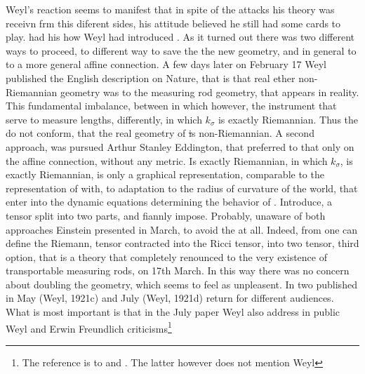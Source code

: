 \documentclass[draft]{article}
\begin{document}
{ Weyl's reaction seems to manifest that in spite of the attacks his theory was receivn frm this diferent sides, his attitude believed he still had some cards to play. had his how Weyl had introduced . As it turned out there was two different ways to proceed, to different way to save the the new geometry, and in general to to a more general affine connection.  A few days later on February 17 Weyl published the English description on Nature, that is that real ether non-Riemannian geometry was to the measuring rod geometry, that appears in reality. This fundamental imbalance, between in which however, the instrument that serve to measure lengths, differently, in which $k_\sigma$ is exactly Riemannian. Thus the \rac do not conform, that the real geometry of \st is non-Riemannian. A second approach, was pursued Arthur Stanley Eddington, that preferred to that only on the affine connection, without any metric. Is exactly Riemannian, in which $k_\sigma$, is exactly Riemannian, is only a graphical representation, comparable to the representation of with, to adaptation to the radius of curvature of the world, that enter into the dynamic equations determining the behavior of \rac. Introduce, a tensor split into two parts, and fiannly impose. Probably, unaware of both approaches Einstein presented in March, to avoid the \rac at all. Indeed, from one can define the Riemann, tensor contracted into the Ricci tensor, into two tensor, third option, that is a theory that completely renounced to the very existence of transportable measuring rods, on 17th March. In this way there was no concern about doubling the geometry, which seems to feel as unpleasent. In two published in  May (Weyl, 1921c) and July (Weyl, 1921d) return for different audiences. What is most important is that in the July paper Weyl also address in public Weyl and Erwin Freundlich criticisms\footnote{The reference is to \citealp{Reichenbach1920a} and \citealp{Freundlich1920}. The latter however does not mention Weyl}  


}
\end{document}
